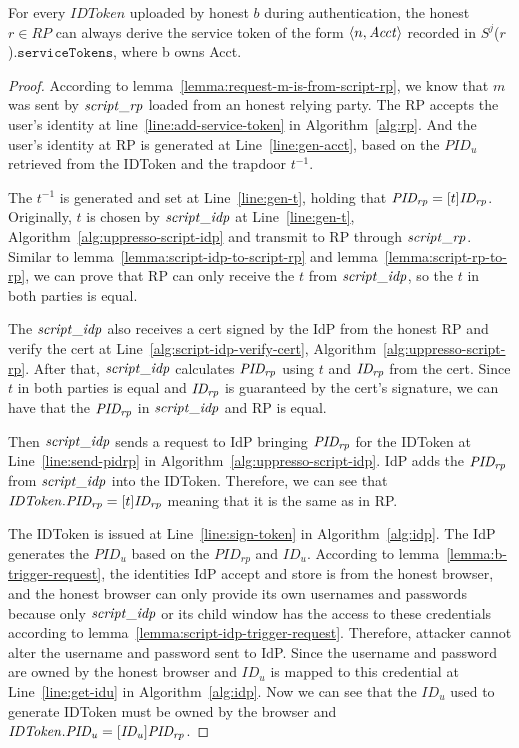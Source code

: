   \begin{lemma}
    For every $IDToken$ uploaded by honest $b$ during authentication, 
    the honest $r \in RP$ can always derive the service token of the form 
    $\langle {{}n, \mathit{Acct}} \rangle$ recorded in $S^j$($r$).$\mathtt{serviceTokens}$, where b owns Acct. 
  \end{lemma}
  \begin{proof}
    According to lemma~\ref{lemma:request-m-is-from-script-rp}, 
    we know that $m$ was sent by $\mathit{script\_rp}$ loaded from an honest relying party. 
    The RP accepts the user's identity at line~\ref{line:add-service-token} in Algorithm~\ref{alg:rp}.
    And the user's identity at RP is generated at Line~\ref{line:gen-acct}, 
    based on the $PID_u$ retrieved from the IDToken and the trapdoor $t^{-1}$. 
    
    The $t^{-1}$ is generated and set at Line~\ref{line:gen-t}, 
    holding that $\mathit{PID_{rp}}=[t]\mathit{ID_{rp}}$.
    Originally, $t$ is chosen by $\mathit{script\_idp}$ at Line~\ref{line:gen-t}, Algorithm~\ref{alg:uppresso-script-idp} 
    and transmit to RP through $\mathit{script\_rp}$.
    \newc
    Similar to lemma~\ref{lemma:script-idp-to-script-rp} and lemma~\ref{lemma:script-rp-to-rp}, 
    we can prove that RP can only receive the $t$ from $\mathit{script\_idp}$, so the $t$ in both parties is equal.
    \oldc

    The $\mathit{script\_idp}$ also receives a cert signed by the IdP from the honest RP and verify the cert at Line~\ref{alg:script-idp-verify-cert}, Algorithm~\ref{alg:uppresso-script-rp}.
    After that, $\mathit{script\_idp}$ calculates $\mathit{PID_{rp}}$ using $t$ and $\mathit{ID_{rp}}$ from the cert.
    \newc
    Since $t$ in both parties is equal and $\mathit{ID_{rp}}$ is guaranteed by the cert's signature, 
    we can have that the $\mathit{PID_{rp}}$ in $\mathit{script\_idp}$ and RP is equal.
    \oldc

    Then $\mathit{script\_idp}$ sends a request to IdP bringing $\mathit{PID_{rp}}$ for the IDToken 
    at Line~\ref{line:send-pidrp} in Algorithm~\ref{alg:uppresso-script-idp}.
    IdP adds the $\mathit{PID_{rp}}$ from $\mathit{script\_idp}$ into the IDToken.
    \newc
    Therefore, we can see that 
    $\mathit{IDToken}.\mathit{PID_{rp}}=[t]\mathit{ID_{rp}}$ meaning that it is the same as in RP.
    \oldc

    The IDToken is issued at Line~\ref{line:sign-token} in Algorithm~\ref{alg:idp}.
    The IdP generates the $PID_u$ based on the $PID_{rp}$ and $ID_u$.
    \newc
    According to lemma~\ref{lemma:b-trigger-request}, 
    the identities IdP accept and store is from the honest browser, 
    and the honest browser can only provide its own usernames and passwords 
    because only $\mathit{script\_idp}$ or its child window has the access to these credentials 
    according to lemma~\ref{lemma:script-idp-trigger-request}.
    Therefore, attacker cannot alter the username and password sent to IdP.
    Since the username and password are owned by the honest browser and 
    $ID_u$ is mapped to this credential at Line~\ref{line:get-idu} in Algorithm~\ref{alg:idp}. 
    Now we can see that the $ID_u$ used to generate IDToken must be owned by the browser 
    and $\mathit{IDToken}.\mathit{PID_{u}}=[\mathit{ID_u}]\mathit{PID_{rp}}$.
    


\end{proof}

